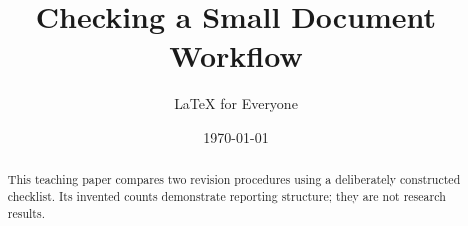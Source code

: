 \documentclass[11pt]{article}
\title{Checking a Small Document Workflow}
\author{LaTeX for Everyone}
\date{\today}
\begin{document}
\maketitle
\begin{abstract}
This teaching paper compares two revision procedures using a
deliberately constructed checklist. Its invented counts demonstrate
reporting structure; they are not research results.
\end{abstract}




\printbibliography
\end{document}

